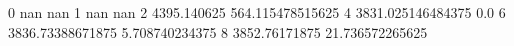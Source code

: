 0 nan nan
1 nan nan
2 4395.140625 564.115478515625
4 3831.025146484375 0.0
6 3836.73388671875 5.708740234375
8 3852.76171875 21.736572265625
